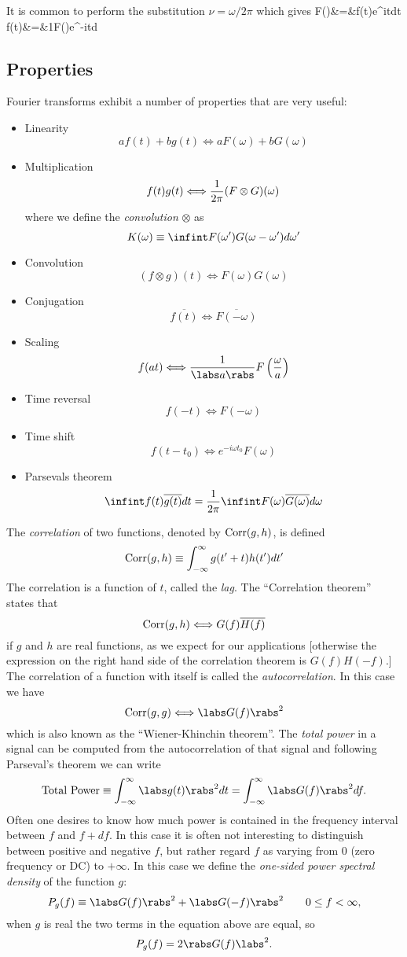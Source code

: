 It is common to perform the substitution $\nu={\omega/2\pi}$ which
gives
\bua
F(\omega)&=&\infint f(t)e^{i\omega t}dt \\
f(t)&=&{1\pi}\infint F(\omega)e^{-i\omega t}d\omega
\eua

\subsection{Properties}

Fourier transforms exhibit a number of properties that are very
useful:
\begin{itemize}
\item Linearity \[ af(t)+bg(t)\Longleftrightarrow
  aF(\omega)+bG(\omega) \]
\item Multiplication \[ f(t)g(t)\Longleftrightarrow{1\over
    2\pi}(F\otimes G)(\omega) \]
where we define the {\it convolution} $\otimes$ as \[
K(\omega)\equiv\infint F(\omega')G(\omega-\omega')d\omega' \]
\item Convolution \[ (f\otimes g)(t)\Longleftrightarrow
  F(\omega)G(\omega) \]
\item Conjugation \[ \overline{f(t)}\Longleftrightarrow\overline{F(-\omega)} \]
\item Scaling \[ f(at) \Longleftrightarrow {1\over
    \labs a\rabs}F\left({\omega\over a}\right) \]
 \item Time reversal \[ f(-t) \Longleftrightarrow F(-\omega) \]
\item Time shift \[ f(t-t_0) \Longleftrightarrow e^{-i\omega
    t_0}F(\omega) \]
\item Parsevals theorem \[ \infint f(t)\overline{g(t)}dt = {1\over
    2\pi}\infint F(\omega)\overline{G(\omega)}d\omega \]
\end{itemize}

The {\it correlation} of two functions, denoted by ${\rm Corr}(g,h)$, is defined
\[
{\rm Corr}(g,h)\equiv\int_{-\infty}^\infty g(t'+t)h(t')dt'
\]
The correlation is a function of $t$, called the {\it lag}. The ``Correlation theorem'' states that 
\[ {\rm Corr}(g,h) \Longleftrightarrow  G(f)\overline{H(f)} \]
if $g$ and $h$ are real functions, as we expect for our applications [otherwise the expression on 
the right hand side of the correlation theorem is $G(f)H(-f)$.] The correlation of a function with itself is called the {\it autocorrelation}. In this case we have 
\[ {\rm Corr}(g,g) \Longleftrightarrow  \labs G(f)\rabs^2 \]
which is also known as the ``Wiener-Khinchin theorem''. The {\it total power} in a signal
can be computed from the autocorrelation of that signal and following Parseval's theorem
we can write
\[ {\rm Total~Power}\equiv\int_{-\infty}^{\infty}\labs g(t)\rabs^2dt
  =\int_{-\infty}^{\infty}\labs G(f)\rabs^2df.
\]
Often one desires to know how much power is contained in the frequency interval between $f$ and $f+df$. In this case it is often not
interesting to distinguish  between positive and negative $f$, but rather regard $f$ as varying from $0$ (zero frequency or DC) to $+\infty$. In this case we define the {\it one-sided power spectral density} of the function $g$:
\[ P_g(f) \equiv \labs G(f)\rabs^2+\labs G(-f)\rabs^2\qquad 0\le f<\infty,\]
when $g$ is real the two terms in the equation above are equal, so 
\[ P_g(f)=2\rabs G(f)\labs^2.\]
